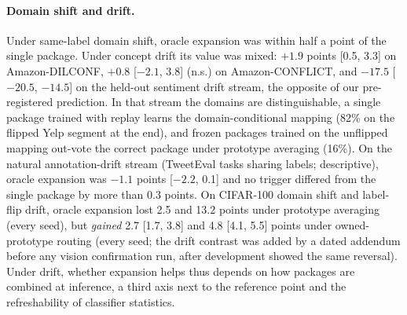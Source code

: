 \documentclass[10pt]{article}
\begin{document}
\paragraph{Domain shift and drift.} Under same-label domain shift, oracle expansion was within half a point of the single package. Under concept drift its value was mixed: $+1.9$ points [0.5, 3.3] on Amazon-DILCONF, $+0.8$ [$-2.1$, 3.8] (n.s.) on Amazon-CONFLICT, and $-17.5$ [$-20.5$, $-14.5$] on the held-out sentiment drift stream, the opposite of our pre-registered prediction. In that stream the domains are distinguishable, a single package trained with replay learns the domain-conditional mapping (82\% on the flipped Yelp segment at the end), and frozen packages trained on the unflipped mapping out-vote the correct package under prototype averaging (16\%). On the natural annotation-drift stream (TweetEval tasks sharing labels; descriptive), oracle expansion was $-1.1$ points [$-2.2$, 0.1] and no trigger differed from the single package by more than 0.3 points. On CIFAR-100 domain shift and label-flip drift, oracle expansion lost 2.5 and 13.2 points under prototype averaging (every seed), but \emph{gained} 2.7 [1.7, 3.8] and 4.8 [4.1, 5.5] points under owned-prototype routing (every seed; the drift contrast was added by a dated addendum before any vision confirmation run, after development showed the same reversal). Under drift, whether expansion helps thus depends on how packages are combined at inference, a third axis next to the reference point and the refreshability of classifier statistics.
\end{document}
